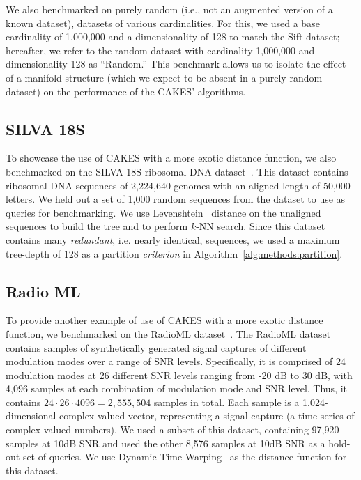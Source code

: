 We also benchmarked on purely random (i.e., not an augmented version of a known dataset), datasets of various cardinalities.
For this, we used a base cardinality of 1,000,000 and a dimensionality of 128 to match the Sift dataset; hereafter, we refer to the random dataset with cardinality 1,000,000 and dimensionality 128 as ``Random.'' 
This benchmark allows us to isolate the effect of a manifold structure (which we expect to be absent in a purely random dataset) on the performance of the CAKES' algorithms. 


\subsection{SILVA 18S}
\label{sec:datasets-and-benchmarks:silva-18s}

To showcase the use of CAKES with a more exotic distance function, we also benchmarked on the SILVA 18S ribosomal DNA dataset~\cite{10.1093/nar/gks1219}.
This dataset contains ribosomal DNA sequences of 2,224,640 genomes with an aligned length of 50,000 letters.
We held out a set of 1,000 random sequences from the dataset to use as queries for benchmarking.
We use Levenshtein~\cite{levenshtein1966binary} distance on the unaligned sequences to build the tree and to perform $k$-NN search.
Since this dataset contains many \textit{redundant}, i.e. nearly identical, sequences, we used a maximum tree-depth of 128 as a partition \textit{criterion} in Algorithm~\ref{alg:methods:partition}.


\subsection{Radio ML}
\label{sec:datasets-and-benchmarks:radio-ml}

To provide another example of use of CAKES with a more exotic distance function, we benchmarked on the RadioML dataset~\cite{oshea2018radioml}.
The RadioML dataset contains samples of synthetically generated signal captures of different modulation modes over a range of SNR levels.
Specifically, it is comprised of 24 modulation modes at 26 different SNR levels ranging from -20 dB to 30 dB, with 4,096 samples at each combination of modulation mode and SNR level.
Thus, it contains $24 \cdot 26 \cdot 4096 = 2,555,504$ samples in total.
Each sample is a 1,024-dimensional complex-valued vector, representing a signal capture (a time-series of complex-valued numbers).
We used a subset of this dataset, containing 97,920 samples at 10dB SNR and used the other 8,576 samples at 10dB SNR as a hold-out set of queries.
We use Dynamic Time Warping~\cite{muller2007dynamic} as the distance function for this dataset.


